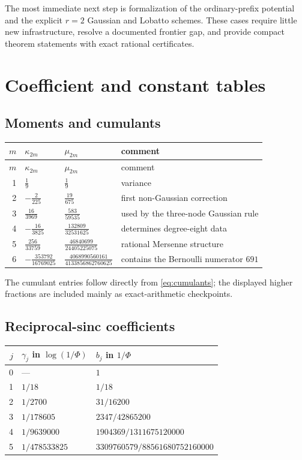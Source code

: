 \documentclass[11pt]{article}
\numberwithin{equation}{section}
\theoremstyle{definition}
\theoremstyle{remark}
\begin{document}
The most immediate next step is formalization of the ordinary-prefix potential and the explicit $r=2$ Gaussian and Lobatto schemes.  These cases require little new infrastructure, resolve a documented frontier gap, and provide compact theorem statements with exact rational certificates.

\appendix

\section{Coefficient and constant tables}
\label{app:tables}

\subsection{Moments and cumulants}

\begin{longtable}{@{}rlll@{}}
\toprule
$m$ & $\kappa_{2m}$ & $\mu_{2m}$ & comment\\
\midrule
\endfirsthead
\toprule
$m$ & $\kappa_{2m}$ & $\mu_{2m}$ & comment\\
\midrule
\endhead
1 & $\frac19$ & $\frac19$ & variance\\
2 & $-\frac2{225}$ & $\frac{19}{675}$ & first non-Gaussian correction\\
3 & $\frac{16}{3969}$ & $\frac{583}{59535}$ & used by the three-node Gaussian rule\\
4 & $-\frac{16}{3825}$ & $\frac{132809}{32531625}$ & determines degree-eight data\\
5 & $\frac{256}{33759}$ & $\frac{46840699}{24405225075}$ & rational Mersenne structure\\
6 & $-\frac{353792}{16769025}$ & $\frac{4068990560161}{4133856862760625}$ & contains the Bernoulli numerator $691$\\
\bottomrule
\end{longtable}

The cumulant entries follow directly from \eqref{eq:cumulants}; the displayed higher fractions are included mainly as exact-arithmetic checkpoints.

\subsection{Reciprocal-sinc coefficients}

\begin{center}
\begin{tabular}{@{}rll@{}}
\toprule
$j$ & $\gamma_j$ in $\log(1/\Phi)$ & $b_j$ in $1/\Phi$\\
\midrule
0 & --- & $1$\\
1 & $1/18$ & $1/18$\\
2 & $1/2700$ & $31/16200$\\
3 & $1/178605$ & $2347/42865200$\\
4 & $1/9639000$ & $1904369/1311675120000$\\
5 & $1/478533825$ & $3309760579/88561680752160000$\\
\bottomrule
\end{tabular}
\end{center}
\end{document}

